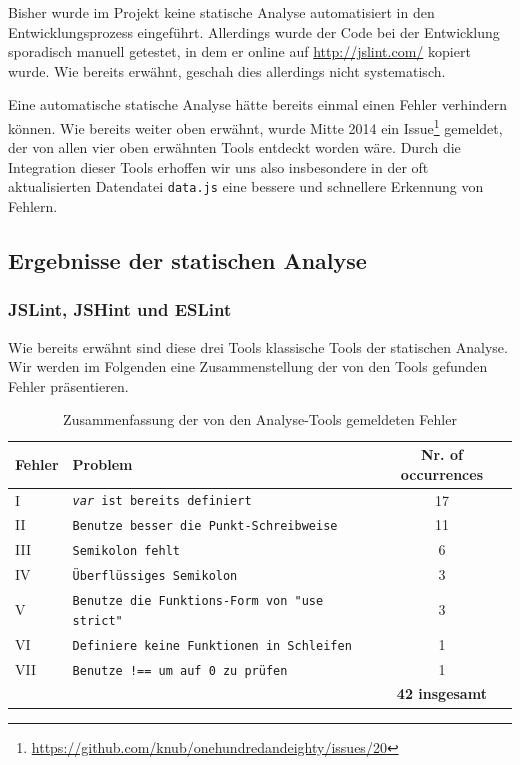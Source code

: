\documentclass[ngerman]{article}
\begin{document}
Bisher wurde im Projekt keine statische Analyse automatisiert in den Entwicklungsprozess eingeführt.
Allerdings wurde der Code bei der Entwicklung sporadisch manuell getestet, in dem er online auf \url{http://jslint.com/} kopiert wurde.
Wie bereits erwähnt, geschah dies allerdings nicht systematisch.

Eine automatische statische Analyse hätte bereits einmal einen Fehler verhindern können.
Wie bereits weiter oben erwähnt, wurde Mitte 2014 ein Issue\footnote{\url{https://github.com/knub/onehundredandeighty/issues/20}} gemeldet, der von allen vier oben erwähnten Tools entdeckt worden wäre.
Durch die Integration dieser Tools erhoffen wir uns also insbesondere in der oft aktualisierten Datendatei \texttt{data.js} eine bessere und schnellere Erkennung von Fehlern.

\subsection{Ergebnisse der statischen Analyse}
\subsubsection{JSLint, JSHint und ESLint}
Wie bereits erwähnt sind diese drei Tools klassische Tools der statischen Analyse.
Wir werden im Folgenden eine Zusammenstellung der von den Tools gefunden Fehler präsentieren.

\begin{table}[h!]
\begin{tabular}{|l|l|c|}
\hline
\textbf{Fehler} & \textbf{Problem} & \textbf{Nr. of occurrences} \\
\hline \hline
I    & \texttt{\emph{var} ist bereits definiert}            & 17          \\
II   & \texttt{Benutze besser die Punkt-Schreibweise}       & 11          \\
III  & \texttt{Semikolon fehlt}                             & 6          \\
IV   & \texttt{Überflüssiges Semikolon}                     & 3          \\
V    & \texttt{Benutze die Funktions-Form von "use strict"} & 3          \\
VI   & \texttt{Definiere keine Funktionen in Schleifen}     & 1          \\
VII  & \texttt{Benutze !== um auf 0 zu prüfen}              & 1          \\
\hline
     &                                                      & \textbf{42 insgesamt} \\
\hline
\hline
\end{tabular}
\caption{Zusammenfassung der von den Analyse-Tools gemeldeten Fehler}
\end{table}
\end{document}
